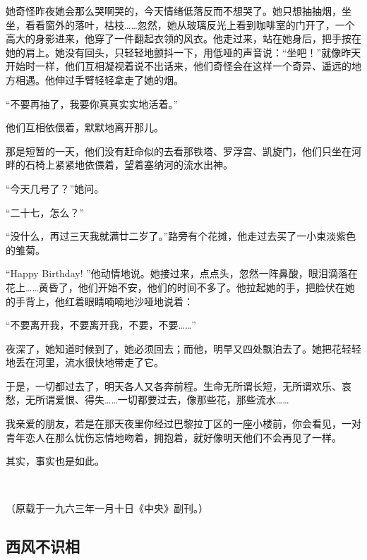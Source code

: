 \par 她奇怪昨夜她会那么哭啊哭的，今天情绪低落反而不想哭了。她只想抽抽烟，坐坐，看看窗外的落叶，枯枝……忽然，她从玻璃反光上看到咖啡室的门开了，一个高大的身影进来，他穿了一件翻起衣领的风衣。他走过来，站在她身后，把手按在她的肩上。她没有回头，只轻轻地颤抖一下，用低哑的声音说：“坐吧！”就像昨天开始时一样，他们互相凝视着说不出话来，他们奇怪会在这样一个奇异、遥远的地方相遇。他伸过手臂轻轻拿走了她的烟。
\par “不要再抽了，我要你真真实实地活着。”
\par 他们互相依偎着，默默地离开那儿。
\par 那是短暂的一天，他们没有赶命似的去看那铁塔、罗浮宫、凯旋门，他们只坐在河畔的石椅上紧紧地依偎着，望着塞纳河的流水出神。
\par “今天几号了？”她问。
\par “二十七，怎么？”
\par “没什么，再过三天我就满廿二岁了。”路旁有个花摊，他走过去买了一小束淡紫色的雏菊。
\par “Happy Birthday! ”他动情地说。她接过来，点点头，忽然一阵鼻酸，眼泪滴落在花上……黄昏了，他们开始不安，他们的时间不多了。他拉起她的手，把脸伏在她的手背上，他红着眼睛喃喃地沙哑地说着：
\par “不要离开我，不要离开我，不要，不要……”
\par 夜深了，她知道时候到了，她必须回去；而他，明早又四处飘泊去了。她把花轻轻地丢在河里，流水很快地带走了它。
\par 于是，一切都过去了，明天各人又各奔前程。生命无所谓长短，无所谓欢乐、哀愁，无所谓爱恨、得失……一切都要过去，像那些花，那些流水……
\par 我亲爱的朋友，若是在那天夜里你经过巴黎拉丁区的一座小楼前，你会看见，一对青年恋人在那么忧伤忘情地吻着，拥抱着，就好像明天他们不会再见了一样。
\par 其实，事实也是如此。
\par  
\par （原载于一九六三年一月十日《中央》副刊。）




\subsection{西风不识相}


